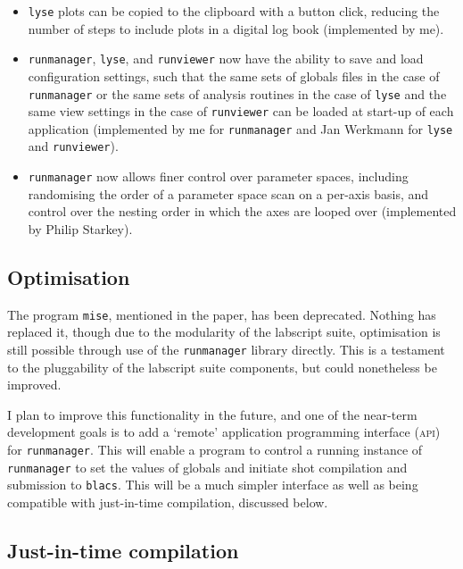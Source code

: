 \begin{itemize}
    \item \texttt{lyse} plots can be copied to the clipboard with a button click, reducing the number of steps to include plots in a digital log book (implemented by me).
    
    \item \texttt{runmanager}, \texttt{lyse}, and \texttt{runviewer} now have the ability to save and load configuration settings, such that the same sets of globals files in the case of \texttt{runmanager} or the same sets of analysis routines in the case of \texttt{lyse} and the same view settings in the case of \texttt{runviewer} can be loaded at start-up of each application (implemented by me for \texttt{runmanager} and Jan Werkmann for \texttt{lyse} and \texttt{runviewer}).
    
    \item \texttt{runmanager} now allows finer control over parameter spaces, including randomising the order of a parameter space scan on a per-axis basis, and control over the nesting order in which the axes are looped over (implemented by Philip Starkey).
\end{itemize}

\subsection{Optimisation}

The program \texttt{mise}, mentioned in the paper, has been deprecated. Nothing has replaced it, though due to the modularity of the labscript suite, optimisation is still possible through use of the \texttt{runmanager} library directly. This is a testament to the pluggability of the labscript suite components, but could nonetheless be improved.

I plan to improve this functionality in the future, and one of the near-term development goals is to add a `remote' application programming interface (\textsc{api}) for \texttt{runmanager}. This will enable a program to control a running instance of \texttt{runmanager} to set the values of globals and initiate shot compilation and submission to \texttt{blacs}. This will be a much simpler interface as well as being compatible with just-in-time compilation, discussed below.

\subsection{Just-in-time compilation}\label{sec:jit}

